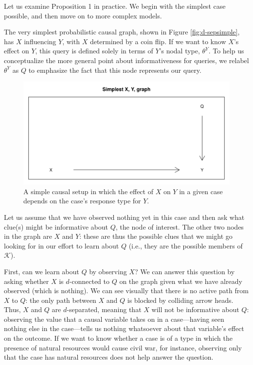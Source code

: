 \documentclass[
  12pt,
]{book}
\begin{document}
Let us examine Proposition 1 in practice. We begin with the simplest case possible, and then move on to more complex models.

The very simplest probabilistic causal graph, shown in Figure \ref{fig:d-sepsimple}, has \(X\) influencing \(Y\), with \(X\) determined by a coin flip. If we want to know \(X\)'s effect on \(Y\), this query is defined solely in terms of \(Y\)'s nodal type, \(\theta^Y\). To help us conceptualize the more general point about informativeness for queries, we relabel \(\theta^Y\) as \(Q\) to emphasize the fact that this node represents our query.

\begin{figure}

{\centering \includegraphics[width=.5\textwidth]{ii_files/figure-latex/sepsimple-1} 

}

\caption{\label{fig:d-sepsimple} A simple causal setup in which the effect of $X$ on $Y$ in a given case depends on the case's response type for $Y$.}\label{fig:sepsimple}
\end{figure}

Let us assume that we have observed nothing yet in this case and then ask what clue(s) might be informative about \(Q\), the node of interest. The other two nodes in the graph are \(X\) and \(Y\): these are thus the possible clues that we might go looking for in our effort to learn about \(Q\) (i.e., they are the possible members of \(\mathcal K\)).

First, can we learn about \(Q\) by observing \(X\)? We can answer this question by asking whether \(X\) is \(d\)-connected to \(Q\) on the graph given what we have already observed (which is nothing). We can see visually that there is no active path from \(X\) to \(Q\): the only path between \(X\) and \(Q\) is blocked by colliding arrow heads. Thus, \(X\) and \(Q\) are \(d\)-separated, meaning that \(X\) will not be informative about \(Q\): observing the value that a causal variable takes on in a case---having seen nothing else in the case---tells us nothing whatsoever about that variable's effect on the outcome. If we want to know whether a case is of a type in which the presence of natural resources would cause civil war, for instance, observing only that the case has natural resources does not help answer the question.
\end{document}
